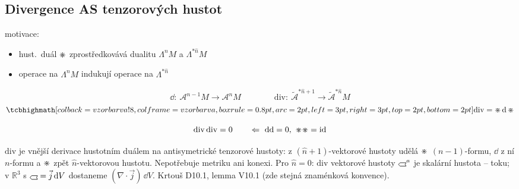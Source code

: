 \subsection{Divergence AS tenzorových hustot}

motivace:
\begin{itemize}[nosep]
  \item[] hust.\ duál $\mathord{\divideontimes}$ zprostředkovává dualitu $\Lambda^nM$ a $\Lambda^{*\hat n}M$
  \item[] operace na $\Lambda^nM$ indukují operace na $\Lambda^{*\hat n}$
\end{itemize}

\begin{definice}[Divergence]
\[
  \dd:\ \mathcal{A}^{n-1}M\to\mathcal{A}^nM \qquad\qquad \mathrm{div}:\ \tilde{\mathcal{A}}^{*\hat n+1}\to\tilde{\mathcal{A}}^{*\hat n}M
\]
\[
  \vzorec{\mathrm{div} = \gmIhdual\,\dd\,\gmIhdual}
\]
\end{definice}
\begin{veta}[Lemma]
\[
  \mathrm{div}\,\mathrm{div} = 0 \qquad \Leftarrow\ \dd\dd = 0,\ \mathord{\divideontimes}\mathord{\divideontimes} = \mathrm{id}
\]
\end{veta}

\begin{vysvetleni}
$\mathrm{div}$ je vnější derivace  hustotním duálem na antisymetrické tenzorové hustoty: z $(\hat n+1)$-vektorové hustoty udělá
$\mathord{\divideontimes}$ $(n-1)$-formu, $\dd$ z ní $n$-formu a $\mathord{\divideontimes}$ zpět $\hat n$-vektorovou hustotu. Nepotřebuje metriku ani konexi.
Pro $\hat n = 0$: $\mathrm{div}$ vektorové hustoty $\gmIhustsym^a$ je skalární hustota --  toku; v $\mathbb{R}^3$ s
$\gmIhustsym = \vec j\,\dd V$ dostaneme $(\nabla\cdot\vec j)\,\dd V$. Krtouš D10.1, lemma V10.1 (zde stejná znaménková konvence).
\end{vysvetleni}

